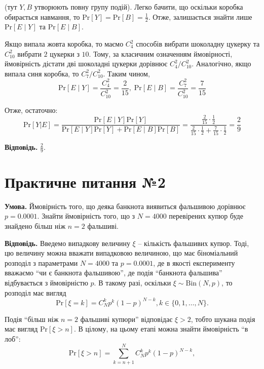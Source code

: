 \documentclass[14pt]{extarticle}
\newcommand{\<}{\langle}
\renewcommand{\>}{\rangle}
\theoremstyle{mystyle}{\newtheorem{definition}{Definition}[section]}
\theoremstyle{mystyle}{\newtheorem{proposition}[definition]{Proposition}}
\theoremstyle{mystyle}{\newtheorem{theorem}[definition]{Theorem}}
\theoremstyle{mystyle}{\newtheorem{lemma}[definition]{Lemma}}
\theoremstyle{mystyle}{\newtheorem{corollary}[definition]{Corollary}}
\theoremstyle{mystyle}{\newtheorem*{remark}{Remark}}
\theoremstyle{mystyle}{\newtheorem*{remarks}{Remarks}}
\theoremstyle{mystyle}{\newtheorem*{example}{Example}}
\theoremstyle{mystyle}{\newtheorem*{examples}{Examples}}
\theoremstyle{definition}{\newtheorem*{exercise}{Exercise}}
\theoremstyle{cstyle}{\newtheorem*{cthm}{}}
\theoremstyle{warn}
\begin{document}
(тут $Y,B$ утворюють повну групу подій). Легко бачити, що оскільки коробка обирається навмання, то $\text{Pr}[Y] = \text{Pr}[B]=\frac{1}{2}$. Отже, залишається 
знайти лише $\text{Pr}[E \mid Y]$ та $\text{Pr}[E \mid B]$.

Якщо випала жовта коробка, то маємо $C_4^2$ способів вибрати шоколадну цукерку та $C_{10}^2$ вибрати $2$ цукерки з $10$. Тому, за класичним означенням ймовірності, 
ймовірність дістати дві шоколадні цукерки дорівнює $C_{4}^2\Big/C_{10}^2$. Аналогічно, якщо випала синя коробка, то $C_{7}^2 \Big/ C_{10}^2$. Таким чином,
\begin{equation}
    \text{Pr}[E \mid Y] = \frac{C_4^2}{C_{10}^2} = \frac{2}{15}, \; \text{Pr}[E \mid B] = \frac{C_7^2}{C_{10}^2} = \frac{7}{15}
\end{equation}

Отже, остаточно:
\begin{equation}
    \text{Pr}[Y|E] =\frac{\text{Pr}[E \mid Y]\text{Pr}[Y]}{\text{Pr}[E \mid Y]\text{Pr}[Y] + \text{Pr}[E \mid B]\text{Pr}[B]} = \frac{\frac{2}{15}\cdot \frac{1}{2}}{\frac{2}{15}\cdot\frac{1}{2} + \frac{7}{15} \cdot \frac{1}{2}} = \frac{2}{9}
\end{equation}

\textbf{Відповідь.} $\frac{2}{9}$.

\pagebreak

\section{Практичне питання №2}

\textbf{Умова.} Ймовірність того, що деяка банкнота виявиться фальшивою дорівнює $p=0.0001$. Знайти
ймовірність того, що з $N=4000$ перевірених купюр буде знайдено більш ніж $n=2$ фальшиві.

\textbf{Відповідь.} Введемо випадкову величину $\xi$ -- кількість фальшивих купюр. Тоді, цю величину 
можна вважати випадковою величиною, що має біноміальний розподіл з параметрами $N=4000$ та $p=0.0001$, 
де в якості експерименту вважаємо ``чи є банкнота фальшивою'', де подія ``банкнота фальшива'' відбувається 
з ймовірністю $p$. В такому разі, оскільки $\xi \sim \text{Bin}(N,p)$, то розподіл має вигляд
\begin{equation}
    \text{Pr}[\xi = k] = C_N^k p^k(1-p)^{N-k}, k \in \{0,1,\ldots,N\}.
\end{equation}

Подія ``більш ніж $n=2$ фальшиві купюри'' відповідає $\xi > 2$, тобто шукана подія має вигляд $\text{Pr}[\xi>n]$. В цілому,
на цьому етапі можна знайти ймовірність ``в лоб'':
\begin{equation}
    \text{Pr}[\xi > n] = \sum_{k=n+1}^N C_N^k p^k(1-p)^{N-k},
\end{equation}
\end{document}
